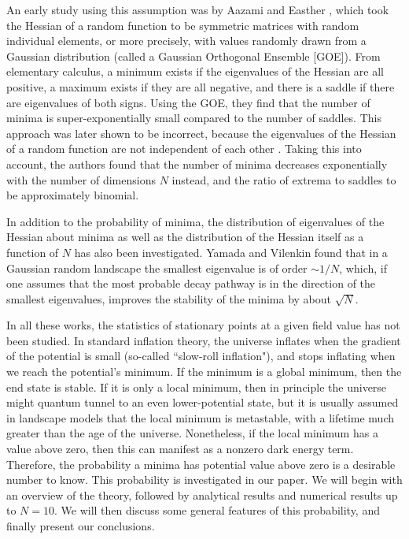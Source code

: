 \documentclass[12pt]{article}
\begin{document}
An early study using this assumption was by Aazami and Easther \cite{Aazami2006}, which took the Hessian of a random function to be symmetric matrices with random individual elements, or more precisely, with values randomly drawn from a Gaussian distribution (called a Gaussian Orthogonal Ensemble [GOE]). From elementary calculus, a minimum exists if the eigenvalues of the Hessian are all positive, a maximum exists if they are all negative, and there is a saddle if there are eigenvalues of both signs. Using the GOE, they find that the number of minima is super-exponentially small compared to the number of saddles. This approach was later shown to be incorrect, because the eigenvalues of the Hessian of a random function are not independent of each other \cite{Easther2016}. Taking this into account, the authors found that the number of minima decreases exponentially with the number of dimensions $N$ instead, and the ratio of extrema to saddles to be approximately binomial.

In addition to the probability of minima, the distribution of eigenvalues of the Hessian about minima as well as the distribution of the Hessian itself as a function of $N$ has also been investigated.\cite{Yamada2018} Yamada and Vilenkin found that in a Gaussian random landscape the smallest eigenvalue is of order $\sim 1/N$, which, if one assumes that the most probable decay pathway is in the direction of the smallest eigenvalues, improves the stability of the minima by about $\sqrt{N}$.

In all these works, the statistics of stationary points at a given field value has not been studied. In standard inflation theory, the universe inflates when the gradient of the potential is small (so-called ``slow-roll inflation"), and stops inflating when we reach the potential's minimum. If the minimum is a global minimum, then the end state is stable. If it is only a local minimum, then in principle the universe might quantum tunnel to an even lower-potential state, but it is usually assumed in landscape models that the local minimum is metastable, with a lifetime much greater than the age of the universe. Nonetheless, if the local minimum has a value above zero, then this can manifest as a nonzero dark energy term. Therefore, the probability a minima has potential value above zero is a desirable number to know. This probability is investigated in our paper. We will begin with an overview of the theory, followed by analytical results and numerical results up to $N=10$. We will then discuss some general features of this probability, and finally present our conclusions.
\end{document}
